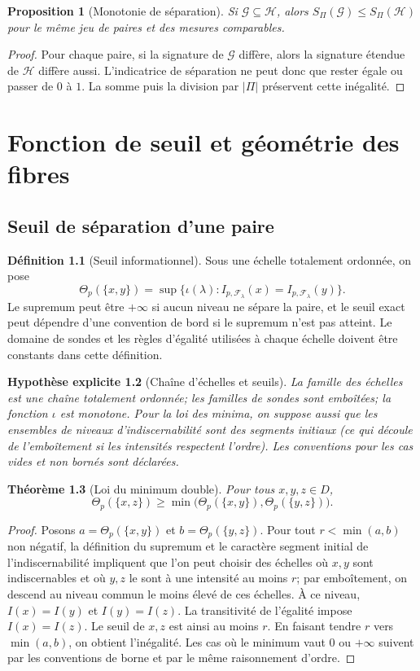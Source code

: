 \documentclass[11pt,oneside]{book}
\newtheorem{theoreme}{Théorème}[chapter]
\newtheorem{proposition}[theoreme]{Proposition}
\newtheorem{hypothese}[theoreme]{Hypothèse explicite}
\theoremstyle{definition}
\newtheorem{definition}[theoreme]{Définition}
\theoremstyle{remark}
\newcommand{\Fcal}{\mathcal F}
\newcommand{\Gcal}{\mathcal G}
\newcommand{\Hcal}{\mathcal H}
\newcommand{\1}{\mathbf 1}
\begin{document}
\begin{proposition}[Monotonie de séparation]
Si $\Gcal\subseteq\Hcal$, alors $S_{\Pi}(\Gcal)\leq S_{\Pi}(\Hcal)$ pour le même jeu de paires et des mesures comparables.
\end{proposition}
\begin{proof}
Pour chaque paire, si la signature de $\Gcal$ diffère, alors la signature étendue de $\Hcal$ diffère aussi. L'indicatrice de séparation ne peut donc que rester égale ou passer de $0$ à $1$. La somme puis la division par $|\Pi|$ préservent cette inégalité.
\end{proof}

\chapter{Fonction de seuil et géométrie des fibres}
\section{Seuil de séparation d'une paire}
\begin{definition}[Seuil informationnel]
Sous une échelle totalement ordonnée, on pose
\[
\Theta_p(\{x,y\})=\sup\{\iota(\lambda): I_{p,\Fcal_\lambda}(x)=I_{p,\Fcal_\lambda}(y)\}.
\]
Le supremum peut être $+\infty$ si aucun niveau ne sépare la paire, et le seuil exact peut dépendre d'une convention de bord si le supremum n'est pas atteint. Le domaine de sondes et les règles d'égalité utilisées à chaque échelle doivent être constants dans cette définition.
\end{definition}

\begin{hypothese}[Chaîne d'échelles et seuils]
La famille des échelles est une chaîne totalement ordonnée; les familles de sondes sont emboîtées; la fonction $\iota$ est monotone. Pour la loi des minima, on suppose aussi que les ensembles de niveaux d'indiscernabilité sont des segments initiaux (ce qui découle de l'emboîtement si les intensités respectent l'ordre). Les conventions pour les cas vides et non bornés sont déclarées.
\end{hypothese}

\begin{theoreme}[Loi du minimum double]
Pour tous $x,y,z\in D$,
\[
\Theta_p(\{x,z\})\geq\min\bigl(\Theta_p(\{x,y\}),\Theta_p(\{y,z\})\bigr).
\]
\end{theoreme}
\begin{proof}
Posons $a=\Theta_p(\{x,y\})$ et $b=\Theta_p(\{y,z\})$. Pour tout $r<\min(a,b)$ non négatif, la définition du supremum et le caractère segment initial de l'indiscernabilité impliquent que l'on peut choisir des échelles où $x,y$ sont indiscernables et où $y,z$ le sont à une intensité au moins $r$; par emboîtement, on descend au niveau commun le moins élevé de ces échelles. À ce niveau, $I(x)=I(y)$ et $I(y)=I(z)$. La transitivité de l'égalité impose $I(x)=I(z)$. Le seuil de $x,z$ est ainsi au moins $r$. En faisant tendre $r$ vers $\min(a,b)$, on obtient l'inégalité. Les cas où le minimum vaut $0$ ou $+\infty$ suivent par les conventions de borne et par le même raisonnement d'ordre.
\end{proof}
\end{document}
